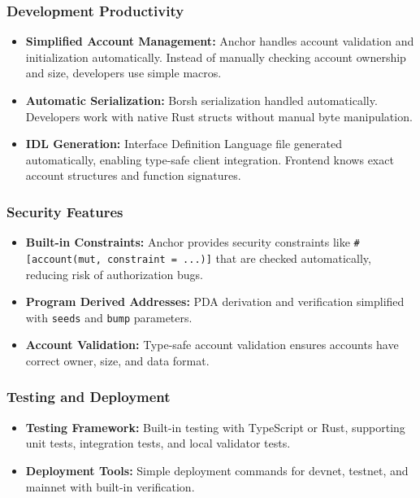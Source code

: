 \documentclass[a4paper,13pt,twoside]{report}
\theoremstyle{definition}
\begin{document}
\subsubsection{Development Productivity}

\begin{itemize}
    \item \textbf{Simplified Account Management:} Anchor handles account validation and initialization automatically. Instead of manually checking account ownership and size, developers use simple macros.

    \item \textbf{Automatic Serialization:} Borsh serialization handled automatically. Developers work with native Rust structs without manual byte manipulation.

    \item \textbf{IDL Generation:} Interface Definition Language file generated automatically, enabling type-safe client integration. Frontend knows exact account structures and function signatures.
\end{itemize}

\subsubsection{Security Features}

\begin{itemize}
    \item \textbf{Built-in Constraints:} Anchor provides security constraints like \texttt{\#[account(mut, constraint = ...)]} that are checked automatically, reducing risk of authorization bugs.

    \item \textbf{Program Derived Addresses:} PDA derivation and verification simplified with \texttt{seeds} and \texttt{bump} parameters.

    \item \textbf{Account Validation:} Type-safe account validation ensures accounts have correct owner, size, and data format.
\end{itemize}

\subsubsection{Testing and Deployment}

\begin{itemize}
    \item \textbf{Testing Framework:} Built-in testing with TypeScript or Rust, supporting unit tests, integration tests, and local validator tests.

    \item \textbf{Deployment Tools:} Simple deployment commands for devnet, testnet, and mainnet with built-in verification.
\end{itemize}
\end{document}
